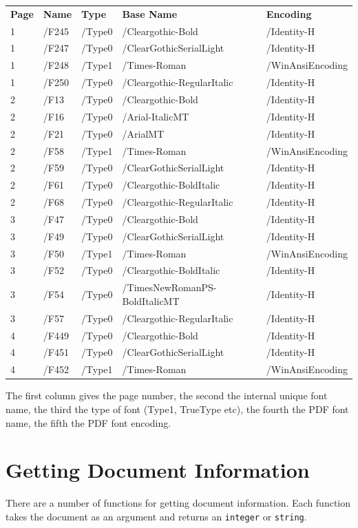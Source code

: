 \documentclass[a4paper]{memoir}
\begin{document}
\begin{framed}
\small\begin{tabular}{lllll}
\textbf{Page} & \textbf{Name} & \textbf{Type} & \textbf{Base Name} & \textbf{Encoding}\\
1 & /F245 & /Type0 & /Cleargothic-Bold & /Identity-H\\
1 & /F247 & /Type0 & /ClearGothicSerialLight & /Identity-H\\
1 & /F248 & /Type1 & /Times-Roman & /WinAnsiEncoding\\
1 & /F250 & /Type0 & /Cleargothic-RegularItalic & /Identity-H\\
2 & /F13 & /Type0 & /Cleargothic-Bold & /Identity-H\\
2 & /F16 & /Type0 & /Arial-ItalicMT & /Identity-H\\
2 & /F21 & /Type0 & /ArialMT & /Identity-H\\
2 & /F58 & /Type1 & /Times-Roman & /WinAnsiEncoding\\
2 & /F59 & /Type0 & /ClearGothicSerialLight & /Identity-H\\
2 & /F61 & /Type0 & /Cleargothic-BoldItalic & /Identity-H\\
2 & /F68 & /Type0 & /Cleargothic-RegularItalic & /Identity-H\\
3 & /F47 & /Type0 & /Cleargothic-Bold & /Identity-H\\
3 & /F49 & /Type0 & /ClearGothicSerialLight & /Identity-H\\
3 & /F50 & /Type1 & /Times-Roman & /WinAnsiEncoding\\
3 & /F52 & /Type0 & /Cleargothic-BoldItalic & /Identity-H\\
3 & /F54 & /Type0 & /TimesNewRomanPS-BoldItalicMT & /Identity-H\\
3 & /F57 & /Type0 & /Cleargothic-RegularItalic & /Identity-H\\
4 & /F449 & /Type0 & /Cleargothic-Bold & /Identity-H\\
4 & /F451 & /Type0 & /ClearGothicSerialLight & /Identity-H\\
4 & /F452 & /Type1 & /Times-Roman & /WinAnsiEncoding
\end{tabular}
\end{framed}

The first column gives the page number, the second the internal unique font
name, the third the type of font (Type1, TrueType etc), the fourth the PDF font
name, the fifth the PDF font encoding.

\section{Getting Document Information}
There are a number of functions for getting document information. Each function takes the document as an argument and returns an \verb!integer! or \verb!string!.
\end{document}
